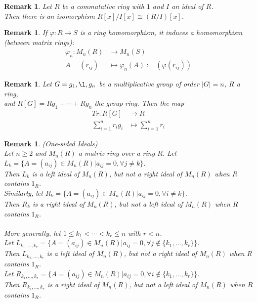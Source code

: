 \documentclass[a4paper,8pt]{article}
\newcommand{\hlt}[1]{\textit{{\color{blue}#1}}}
\theoremstyle{theorem}
\newtheorem{remark}[theorem]{Remark}
\begin{document}
\begin{remark}
Let $R$ be a commutative ring with $1$ and $I$ an ideal of $R$.\\
Then there is an isomorphism $R[x]/I[x] \cong (R/I)[x]$.\\	
\end{remark}


\begin{remark}
If $\varphi: R \rightarrow S$ is a ring homomorphism, it induces a homomorphism (between matrix rings):
\begin{align}
\varphi_n: M_n(R) &\rightarrow M_n(S) \nonumber \\
A = (r_{ij}) &\mapsto \varphi_n(A) := (\varphi(r_{ij})) \nonumber
\end{align}
\end{remark}


\begin{remark}
Let $G={g_1, \l , g_n}$ be a multiplicative group of order $\left| G \right| = n$, $R$ a ring, \\
and $R[G]=Rg_1 + \cdots + Rg_n$ the group ring. Then the map 
\begin{align}
Tr: R[G] &\rightarrow R \nonumber \\
\sum_{i=1}^{n} r_i g_i &\mapsto \sum_{i=1}^{n} r_i \nonumber
\end{align}
\end{remark}


\begin{remark}
\hlt{(One-sided Ideals)}\\
Let $n \geq 2$ and $M_n(R)$ a matrix ring over a ring $R$. Let $L_k = \{A = (a_{ij}) \in M_n(R) | a_{ij} = 0, \forall j \neq k\}$.\\
Then $L_k$ is a left ideal of $M_n(R)$, but not a right ideal of $M_n(R)$ when $R$ contains $1_R$.\\
Similarly, let $R_k = \{A = (a_{ij}) \in M_n(R) | a_{ij} = 0, \forall i \neq k\}$.\\
Then $R_k$ is a right ideal of $M_n(R)$, but not a left ideal of $M_n(R)$ when $R$ contains $1_R$.\\
\\
More generally, let $1 \leq k_1 < \cdots < k_r \leq n$ with $r < n$.\\
Let $L_{k_1, \ldots, k_r} = \{A = (a_{ij}) \in M_n(R) | a_{ij} = 0, \forall j \notin \{k_1, \ldots, k_r\}\}$.\\
Then $L_{k_1, \ldots, k_r}$ is a left ideal of $M_n(R)$, but not a right ideal of $M_n(R)$ when $R$ contains $1_R$.\\
Let $R_{k_1, \ldots, k_r} = \{A = (a_{ij}) \in M_n(R) | a_{ij} = 0, \forall i \notin \{k_1, \ldots, k_r\}\}$.\\
Then $R_{k_1, \ldots, k_r}$ is a right ideal of $M_n(R)$, but not a left ideal of $M_n(R)$ when $R$ contains $1_R$.\\
\end{remark}
\end{document}
